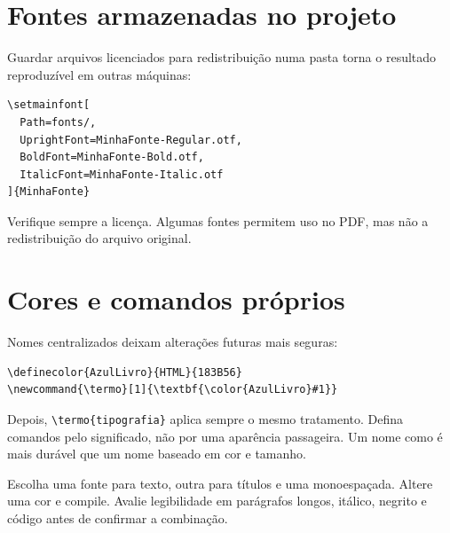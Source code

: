 \section{Fontes armazenadas no projeto}

Guardar arquivos licenciados para redistribuição numa pasta 
torna o resultado reproduzível em outras máquinas:

\begin{lstlisting}[language=LaTeXBook]
\setmainfont[
  Path=fonts/,
  UprightFont=MinhaFonte-Regular.otf,
  BoldFont=MinhaFonte-Bold.otf,
  ItalicFont=MinhaFonte-Italic.otf
]{MinhaFonte}
\end{lstlisting}

Verifique sempre a licença. Algumas fontes permitem uso no PDF, mas não a
redistribuição do arquivo original.

\section{Cores e comandos próprios}

Nomes centralizados deixam alterações futuras mais seguras:

\begin{lstlisting}[language=LaTeXBook]
\definecolor{AzulLivro}{HTML}{183B56}
\newcommand{\termo}[1]{\textbf{\color{AzulLivro}#1}}
\end{lstlisting}

Depois, \verb|\termo{tipografia}| aplica sempre o mesmo tratamento. Defina
comandos pelo significado, não por uma aparência passageira. Um nome como
 é mais durável que um nome baseado em cor e tamanho.

\begin{pratica}
  Escolha uma fonte para texto, outra para títulos e uma monoespaçada. Altere
  uma cor e compile. Avalie legibilidade em parágrafos longos, itálico, negrito
  e código antes de confirmar a combinação.
\end{pratica}

